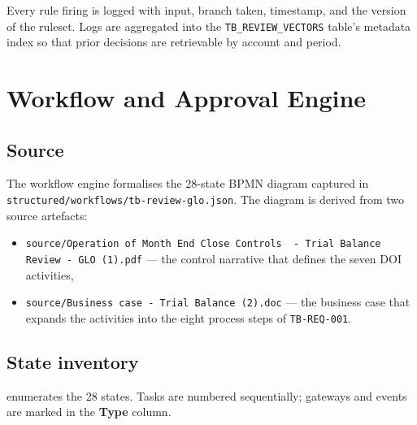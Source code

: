 \documentclass[11pt,a4paper,twoside]{report}
\newcommand{\corpus}{}
\begin{document}
Every rule firing is logged with input, branch taken, timestamp, and
the version of the ruleset. Logs are aggregated into the
\texttt{TB\_REVIEW\_VECTORS} table's metadata index so that prior
decisions are retrievable by account and period.
\chapter{Workflow and Approval Engine}\label{ch:workflow}

\section{Source}

The workflow engine formalises the 28-state BPMN diagram captured in
\corpus\texttt{structured/workflows/tb-review-glo.json}. The diagram
is derived from two source artefacts:

\begin{itemize}
\item \corpus\texttt{source/Operation of Month End Close Controls\ \ - Trial Balance Review - GLO (1).pdf}
--- the control narrative that defines the seven DOI activities,
\item \corpus\texttt{source/Business case - Trial Balance (2).doc}
--- the business case that expands the activities into the
eight process steps of \texttt{TB-REQ-001}.
\end{itemize}

\section{State inventory}

 enumerates the 28 states. Tasks are numbered
sequentially; gateways and events are marked in the \textbf{Type}
column.
\end{document}
